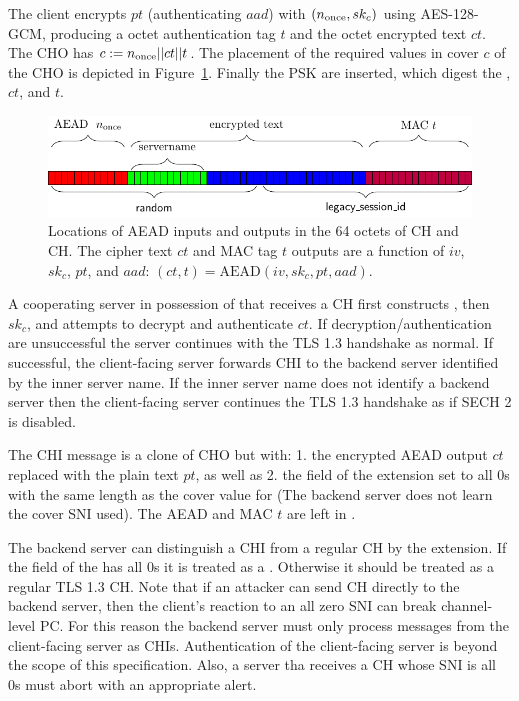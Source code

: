The client encrypts $pt$ (authenticating $aad$) with $(\nonce,sk_c)$ using AES-128-GCM, producing a \sechtwotaglen{} octet authentication tag $t$ and the \sechtwocipherlen{} octet encrypted text $ct$. The \ac{CHO} has $c:=\nonce||ct||t$. The placement of the required values in cover $c$ of the \ac{CHO} is depicted in Figure~\ref{fig:sech2-cover}.
Finally the \ac{PSK}  are inserted, which digest the \nonce, $ct$, and $t$.

\begin{figure}[htb]
\centering
\includegraphics[width=\linewidth]{figure/sech2-cover.pdf}
\captionsetup{width=.8\linewidth} 
\caption[SECH 2 Cover]{Locations of AEAD inputs and outputs in the 64 octets of \ac{CH} and \ac{CH}. The cipher text $ct$ and MAC tag $t$ outputs are a function of $iv$, $sk_c$, $pt$, and $aad$: $(ct,t)=\text{AEAD}(iv,sk_c,pt,aad)$.}
\label{fig:sech2-cover}
\end{figure}

A cooperating server in possession of \varsechlongtermkey{} that receives a \ac{CH}
first constructs , then $sk_c$,
and attempts to decrypt and authenticate $ct$.
If decryption/authentication are unsuccessful the server continues with the \ac{TLS} 1.3 handshake as normal.
If successful, the client-facing server forwards \ac{CHI} to the backend server identified by the inner server name.
If the inner server name does not identify a backend server then the client-facing server continues the \ac{TLS} 1.3 handshake as if \ac{SECH} 2 is disabled.

The \ac{CHI} message  is a clone of \ac{CHO} but with:
1. the encrypted AEAD output $ct$ replaced with the plain text $pt$, as well as
2. the  field of the  extension set to all 0s with the same length as the cover value for  (The backend server does not learn the cover \ac{SNI} used).
The \ac{AEAD} \nonce and \ac{MAC} $t$ are left in .

The backend server can distinguish a \ac{CHI}
from a regular \ac{CH} by the  extension.
If the  field of the  has all 0s it is treated as a .
Otherwise it should be treated as a regular \ac{TLS} 1.3 \ac{CH}.
Note that if an attacker can send \ac{CH} directly to
the backend server,
then the client's reaction to an all zero \ac{SNI} can break
channel-level \ac{PC}.
For this reason the backend server must only process messages
from the client-facing server as \ac{CHI}s.
Authentication of the client-facing server is beyond the scope of this specification.
Also, a server tha receives a \ac{CH} whose \ac{SNI} is all 0s must abort with an appropriate alert. %

